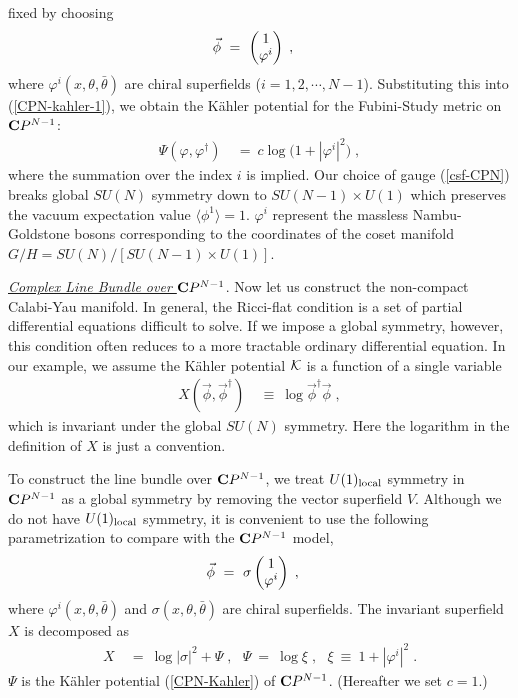 \documentclass[a4paper,11pt]{article}
\newcommand{\ul}{\underline}
\newcommand{\kahler}{K\"{a}hler }
\begin{document}
{fixed by choosing 
\begin{align}
\vec{\phi} \ &= \ \begin{pmatrix}
 1 \cr 
 \varphi^i 
\end{pmatrix} \; , \label{csf-CPN}
\end{align}
where $\varphi^i (x, \theta, \bar{\theta})$ are chiral superfields ($i
= 1, 2, \cdots, N-1$).
Substituting this into (\ref{CPN-kahler-1}),
we obtain the \kahler potential for 
the Fubini-Study metric on ${\bf C}P^{N-1}$:
\begin{align}
 \Psi(\varphi, \varphi^{\dagger}) 
 \ &= \ 
 c \log \big( 1 + |\varphi^i|^2 \big) \; , \label{CPN-Kahler}
\end{align}
where the summation over the index $i$ is implied. 
Our choice of gauge (\ref{csf-CPN}) breaks global $SU(N)$ symmetry down
to $SU(N-1) \times U(1)$ 
which preserves the vacuum expectation value 
$\langle \phi^1 \rangle = 1$.
$\varphi^i$ represent the massless Nambu-Goldstone bosons
corresponding to the coordinates of 
the coset manifold $G/H = SU(N)/[SU(N-1) \times U(1)]$.

\ul{\sl Complex Line Bundle over ${\bf C}P^{N-1}$}. \hfil\break
Now let us construct the non-compact Calabi-Yau manifold. 
In general,
the Ricci-flat condition is a set of partial differential equations 
difficult to solve.
If we impose a global symmetry, however,
this condition often reduces to a more tractable ordinary differential
equation.
In our example,
we assume the \kahler potential ${\cal K}$ is a function of a single
variable
\begin{align}
X (\vec{\phi}, \vec{\phi}^{\dagger}) 
\ &\equiv \ 
\log \vec{\phi}^{\dagger} \vec{\phi} \; , \label{inv-X-Calabi}
\end{align}
which is invariant under the global $SU(N)$ symmetry.
Here the logarithm in the definition of $X$ is just a convention.

To construct the line bundle over ${\bf C}P^{N-1}$, 
we treat $U(1)_{\rm local}$ symmetry in ${\bf C}P^{N-1}$ 
as a global symmetry
by removing the vector superfield $V$.
Although we do not have $U(1)_{\rm local}$ symmetry,
it is convenient to use the following parametrization 
to compare with the ${\bf C}P^{N-1}$ model,
\begin{align}
\vec{\phi} \ &= \ \sigma \begin{pmatrix}
 1 \cr 
 \varphi^i 
\end{pmatrix} \; , \label{non-cpt-csf}
\end{align}
where $\varphi^i (x , \theta, \bar{\theta})$ and 
$\sigma (x, \theta , \bar{\theta})$ are chiral superfields.
The invariant superfield $X$ is decomposed as
\begin{align}
X \ &= \ 
\log |\sigma|^2 + \Psi \; , \ \ \ 
\Psi \ = \ \log \xi \; , \ \ \ 
\xi 
\ \equiv \ 
1 + |\varphi^i|^2 \; . \label{inv-field}
\end{align}
$\Psi$ is the \kahler potential (\ref{CPN-Kahler}) 
of ${\bf C}P^{N-1}$. 
(Hereafter we set $c=1$.) 

}
\end{document}
